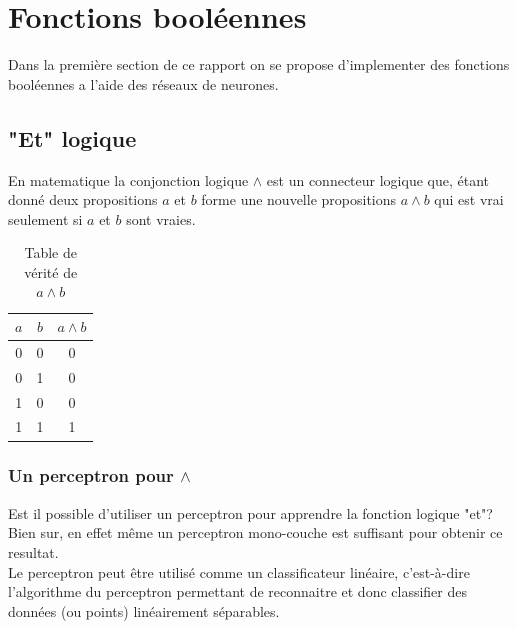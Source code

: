 \documentclass[twoside,openright,a4paper,11pt,french]{article}
\begin{document}
\pagestyle{plain}
\setlength{\parindent}{0pt}



\parskip=0pt
\tableofcontents
\clearpage


\vspace{5cm}


\section{Fonctions booléennes}

Dans la première section de ce rapport on se propose
d'implementer des fonctions booléennes a l'aide des réseaux
de neurones. 

\subsection{"Et" logique}

En matematique la conjonction logique $\land$ est un
connecteur logique que, étant donné deux propositions $a$ et $b$
forme une nouvelle propositions $a \land b$ qui est vrai seulement
si $a$ et $b$ sont vraies.

\begin{table}[ht]
  \centering
  \begin{tabular}{| c | c | c |}
    \hline
    \textbf{$a$} & \textbf{$b$} & \textbf{$a \land b$}\\
    \hline
    0 & 0  & 0 \\
    \hline
    0 & 1  & 0 \\
    \hline
    1 & 0  & 0 \\
    \hline
    1 & 1  & 1 \\
    \hline
  \end{tabular}
  \caption{Table de vérité de $a \land b$}
  \label{tab:et}
\end{table}




\subsubsection{Un perceptron pour $\land$} 

Est il possible d'utiliser un perceptron pour apprendre la fonction logique
"et"? Bien sur, en effet même un perceptron mono-couche est suffisant pour
obtenir ce resultat.\\

Le perceptron peut être utilisé comme un classificateur linéaire, c'est-à-dire l'algorithme du
perceptron permettant de reconnaitre et donc classifier des données (ou points)
linéairement séparables.\\
\end{document}
